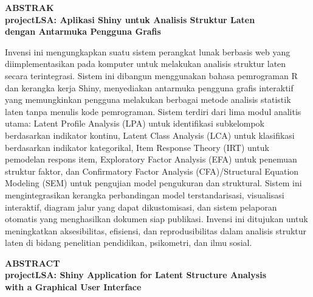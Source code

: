 \documentclass[12pt,a4paper]{article}
\begin{document}
\begin{center}
\textbf{\large ABSTRAK}\\[12pt]
\textbf{projectLSA: Aplikasi Shiny untuk Analisis Struktur Laten\\dengan Antarmuka Pengguna Grafis}
\end{center}

\vspace{12pt}

Invensi ini mengungkapkan suatu sistem perangkat lunak berbasis web yang diimplementasikan pada komputer untuk melakukan analisis struktur laten secara terintegrasi. Sistem ini dibangun menggunakan bahasa pemrograman R dan kerangka kerja Shiny, menyediakan antarmuka pengguna grafis interaktif yang memungkinkan pengguna melakukan berbagai metode analisis statistik laten tanpa menulis kode pemrograman. Sistem terdiri dari lima modul analitis utama: Latent Profile Analysis (LPA) untuk identifikasi subkelompok berdasarkan indikator kontinu, Latent Class Analysis (LCA) untuk klasifikasi berdasarkan indikator kategorikal, Item Response Theory (IRT) untuk pemodelan respons item, Exploratory Factor Analysis (EFA) untuk penemuan struktur faktor, dan Confirmatory Factor Analysis (CFA)/Structural Equation Modeling (SEM) untuk pengujian model pengukuran dan struktural. Sistem ini mengintegrasikan kerangka perbandingan model terstandarisasi, visualisasi interaktif, diagram jalur yang dapat dikustomisasi, dan sistem pelaporan otomatis yang menghasilkan dokumen siap publikasi. Invensi ini ditujukan untuk meningkatkan aksesibilitas, efisiensi, dan reprodusibilitas dalam analisis struktur laten di bidang penelitian pendidikan, psikometri, dan ilmu sosial.

\vspace{24pt}

\begin{center}
\textbf{\large ABSTRACT}\\[12pt]
\textbf{projectLSA: Shiny Application for Latent Structure Analysis\\with a Graphical User Interface}
\end{center}

\vspace{12pt}
\end{document}
